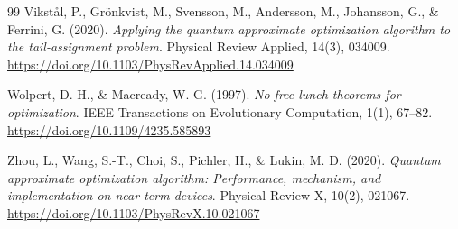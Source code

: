 \begin{thebibliography}{99}
	Vikst{\aa}l, P., Gr\"onkvist, M., Svensson, M., Andersson, M., Johansson, G., \& Ferrini, G. (2020).
	\emph{Applying the quantum approximate optimization algorithm to the tail-assignment problem}.
	Physical Review Applied, 14(3), 034009.
	\url{https://doi.org/10.1103/PhysRevApplied.14.034009}

	Wolpert, D. H., \& Macready, W. G. (1997).
	\emph{No free lunch theorems for optimization}.
	IEEE Transactions on Evolutionary Computation, 1(1), 67--82.
	\url{https://doi.org/10.1109/4235.585893}

	Zhou, L., Wang, S.-T., Choi, S., Pichler, H., \& Lukin, M. D. (2020).
	\emph{Quantum approximate optimization algorithm: Performance, mechanism, and implementation on near-term devices}.
	Physical Review X, 10(2), 021067.
	\url{https://doi.org/10.1103/PhysRevX.10.021067}

\end{thebibliography}
